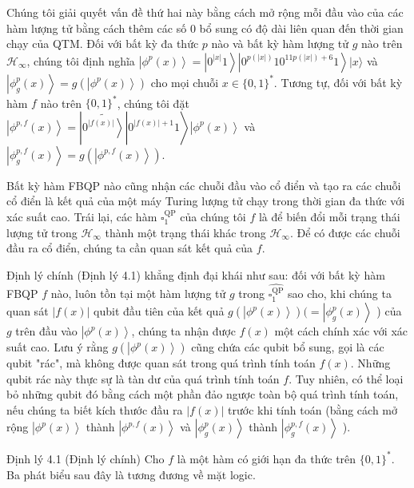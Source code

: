 \documentclass[10pt]{article}
\begin{document}
Chúng tôi giải quyết vấn đề thứ hai này bằng cách mở rộng mỗi đầu vào của các hàm lượng tử bằng cách thêm các số 0 bổ sung có độ dài liên quan đến thời gian chạy của QTM. Đối với bất kỳ đa thức $p$ nào và bất kỳ hàm lượng tử $g$ nào trên $\mathcal{H}_{\infty}$, chúng tôi định nghĩa $\left|\phi^{p}(x)\right\rangle=\left|0^{|x|} 1\right\rangle\left|0^{p(|x|)} 10^{11 p(|x|)+6} 1\right\rangle|x\rangle$ và $\left|\phi_{g}^{p}(x)\right\rangle=g\left(\left|\phi^{p}(x)\right\rangle\right)$ cho mọi chuỗi $x \in\{0,1\}^{*}$. Tương tự, đối với bất kỳ hàm $f$ nào trên $\{0,1\}^{*}$, chúng tôi đặt $\left.\left|\phi^{p, f}(x)\right\rangle=\left|\widetilde{\left.0^{|f(x)|}\right\rangle}\right| 0^{|f(x)|+1} 1\right\rangle\left|\phi^{p}(x)\right\rangle$ và $\left|\phi_{g}^{p, f}(x)\right\rangle=g\left(\left|\phi^{p, f}(x)\right\rangle\right)$.

Bất kỳ hàm FBQP nào cũng nhận các chuỗi đầu vào cổ điển và tạo ra các chuỗi cổ điển là kết quả của một máy Turing lượng tử chạy trong thời gian đa thức với xác suất cao. Trái lại, các hàm $\square_{1}^{\mathrm{QP}}$ của chúng tôi $f$ là để biến đổi mỗi trạng thái lượng tử trong $\mathcal{H}_{\infty}$ thành một trạng thái khác trong $\mathcal{H}_{\infty}$. Để có được các chuỗi đầu ra cổ điển, chúng ta cần quan sát kết quả của $f$.

Định lý chính (Định lý 4.1) khẳng định đại khái như sau: đối với bất kỳ hàm FBQP $f$ nào, luôn tồn tại một hàm lượng tử $g$ trong $\widehat{\square_{1}^{\mathrm{QP}}}$ sao cho, khi chúng ta quan sát $|f(x)|$ qubit đầu tiên của kết quả $g\left(\left|\phi^{p}(x)\right\rangle\right)(= \left|\phi_{g}^{p}(x)\right\rangle$ ) của $g$ trên đầu vào $\left|\phi^{p}(x)\right\rangle$, chúng ta nhận được $f(x)$ một cách chính xác với xác suất cao. Lưu ý rằng $g\left(\left|\phi^{p}(x)\right\rangle\right)$ cũng chứa các qubit bổ sung, gọi là các qubit "rác", mà không được quan sát trong quá trình tính toán $f(x)$. Những qubit rác này thực sự là tàn dư của quá trình tính toán $f$. Tuy nhiên, có thể loại bỏ những qubit đó bằng cách một phần đảo ngược toàn bộ quá trình tính toán, nếu chúng ta biết kích thước đầu ra $|f(x)|$ trước khi tính toán (bằng cách mở rộng $\left|\phi^{p}(x)\right\rangle$ thành $\left|\phi^{p, f}(x)\right\rangle$ và $\left|\phi_{g}^{p}(x)\right\rangle$ thành $\left|\phi_{g}^{p, f}(x)\right\rangle$ ).

Định lý 4.1 (Định lý chính) Cho $f$ là một hàm có giới hạn đa thức trên $\{0,1\}^{*}$. Ba phát biểu sau đây là tương đương về mặt logic.
\end{document}
